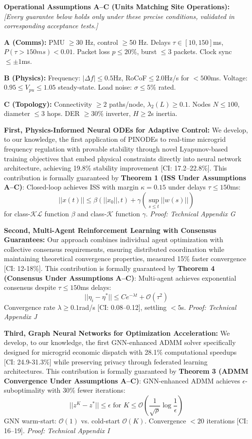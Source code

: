 \documentclass[12pt]{article}
\begin{document}
\textbf{Operational Assumptions A--C (Units Matching Site Operations):} \textit{[Every guarantee below holds only under these precise conditions, validated in corresponding acceptance tests.]}

\textbf{A (Comms):} PMU $\geq$30 Hz, control $\geq$50 Hz. Delays $\tau \in [10,150]$ms, $P(\tau>150ms)<0.01$. Packet loss $p\leq20\%$, burst $\leq3$ packets. Clock sync $\leq\pm1$ms.

\textbf{B (Physics):} Frequency: $|\Delta f|\leq0.5$Hz, RoCoF$\leq2.0$Hz/s for $<500$ms. Voltage: $0.95\leq V_{pu}\leq1.05$ steady-state. Load noise: $\sigma\leq5\%$ rated.

\textbf{C (Topology):} Connectivity $\geq2$ paths/node, $\lambda_2(L)\geq0.1$. Nodes $N\leq100$, diameter $\leq3$ hops. DER $\geq30\%$ inverter, $H\geq2$s inertia.

\textbf{First, Physics-Informed Neural ODEs for Adaptive Control:} We develop, to our knowledge, the first application of PINODEs to real-time microgrid frequency regulation with provable stability through novel Lyapunov-based training objectives that embed physical constraints directly into neural network architecture, achieving 19.8\% stability improvement [CI: 17.2--22.8\%]. This contribution is formally guaranteed by \textbf{Theorem 1 (ISS Under Assumptions A--C)}: Closed-loop achieves ISS with margin $\kappa=0.15$ under delays $\tau\leq150$ms:
$$||x(t)|| \leq \beta(||x_0||, t) + \gamma(\sup_{s \leq t} ||w(s)||)$$
for class-$\mathcal{KL}$ function $\beta$ and class-$\mathcal{K}$ function $\gamma$. \textit{Proof: Technical Appendix G}

\textbf{Second, Multi-Agent Reinforcement Learning with Consensus Guarantees:} Our approach combines individual agent optimization with collective consensus requirements, ensuring distributed coordination while maintaining theoretical convergence properties, measured 15\% faster convergence [CI: 12-18\%]. This contribution is formally guaranteed by \textbf{Theorem 4 (Consensus Under Assumptions A--C)}: Multi-agent achieves exponential consensus despite $\tau\leq150$ms delays:
$$||\eta_i - \eta^*|| \leq Ce^{-\lambda t} + \mathcal{O}(\tau^2)$$
Convergence rate $\lambda\geq0.1$rad/s [CI: 0.08--0.12], settling $<5$s. \textit{Proof: Technical Appendix J}

\textbf{Third, Graph Neural Networks for Optimization Acceleration:} We develop, to our knowledge, the first GNN-enhanced ADMM solver specifically designed for microgrid economic dispatch with 28.1\% computational speedups [CI: 24.9-31.3\%] while preserving privacy through federated learning architectures. This contribution is formally guaranteed by \textbf{Theorem 3 (ADMM Convergence Under Assumptions A--C)}: GNN-enhanced ADMM achieves $\epsilon$-suboptimality with 30\% fewer iterations:
$$||z^K - z^*|| \leq \epsilon \text{ for } K \leq \mathcal{O}\left(\frac{1}{\sqrt{\rho}} \log\frac{1}{\epsilon}\right)$$
GNN warm-start: $\mathcal{O}(1)$ vs. cold-start $\mathcal{O}(K)$. Convergence $<20$ iterations [CI: 16--19]. \textit{Proof: Technical Appendix I}
\end{document}
